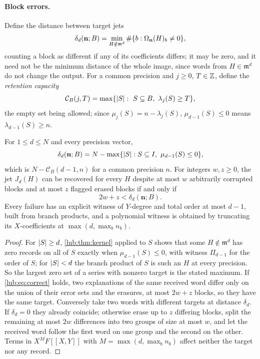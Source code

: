 \paragraph{Block errors.}
Define the distance between target jets
\[
 \delta_d(\mathbf n;B)=\min_{H\notin\mathfrak m^d}\#\{b:\Omega_{\mathbf n}(H)_b\ne0\},
\]
counting a block as different if any of its coefficients differs; it may be zero, and
it need not be the minimum distance of the whole image, since words from $H\in\mathfrak m^d$
do not change the output. For a common precision and $j\ge0$, $T\in\mathbb{Z}$, define the \emph{retention
capacity}
\[
 \mathcal C_B(j,T)=\max\{\lvert S\rvert:\ S\subseteq B,\ \lambda_j(S)\ge T\},
\]
the empty set being allowed; since $\mu_j(S)=n-\lambda_j(S)$, $\mu_{d-1}(S)\le0$ means
$\lambda_{d-1}(S)\ge n$.

\begin{theorem}\label{lub:thm:distance}
For $1\le d\le N$ and every precision vector,
\[
 \delta_d(\mathbf n;B)=N-\max\{\lvert S\rvert:S\subseteq I,\ \mu_{d-1}(S)\le0\},
\]
which is $N-\mathcal C_B(d-1,n)$ for a common precision $n$. For integers $w,z\ge0$, the jet
$J_d(H)$ can be recovered for every $H$ despite at most $w$ arbitrarily corrupted blocks and at most
$z$ flagged erased blocks if and only if
\begin{equation}\label{lub:eq:correct}
 2w+z<\delta_d(\mathbf n;B).
\end{equation}
Every failure has an explicit witness of $Y$-degree and total order at most $d-1$, built from branch
products, and a polynomial witness is obtained by truncating its $X$-coefficients at
$\max(d,\max_bn_b)$.
\end{theorem}

\begin{proof}
For $\lvert S\rvert\ge d$, \cref{lub:thm:kernel} applied to $S$ shows that some $H\notin\mathfrak m^d$ has zero
records on all of $S$ exactly when $\mu_{d-1}(S)\le0$, with witness $\Pi_{d-1}$ for the order of $S$;
for $\lvert S\rvert<d$ the branch product of $S$ is such an $H$ at every precision. So the largest zero set of
a series with nonzero target is the stated maximum. If \eqref{lub:eq:correct} holds, two
explanations of the same received word differ only on the union of their error sets and the
erasures, at most $2w+z$ blocks, so they have the same target. Conversely take two words with
different targets at distance $\delta_d$. If $\delta_d=0$ they already coincide; otherwise erase up to
$z$ differing blocks, split the remaining at most $2w$ differences into two groups of size at most $w$,
and let the received word follow the first word on one group and the second on the other. Terms in
$X^MF[[X,Y]]$ with $M=\max(d,\max_bn_b)$ affect neither the target nor any record.
\end{proof}

